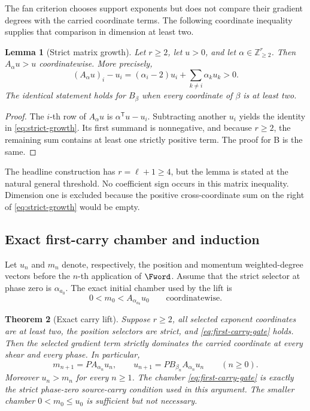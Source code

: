 \documentclass[11pt,letterpaper]{article}
\newtheorem{theorem}{Theorem}[section]
\newtheorem{lemma}[theorem]{Lemma}
\theoremstyle{definition}
\theoremstyle{remark}
\numberwithin{equation}{section}
\begin{document}
The fan criterion chooses support exponents but does not compare their
gradient degrees with the carried coordinate terms.  The following
coordinate inequality supplies that comparison in dimension at least two.

\begin{lemma}[Strict matrix growth]
\label{lem:strict-growth}
Let \(r\geq2\), let \(u>0\), and let
\(\alpha\in\mathbb Z_{\geq2}^{r}\).  Then \(A_\alpha u>u\)
coordinatewise.  More precisely,
\begin{equation}
 (A_\alpha u)_i-u_i
  =(\alpha_i-2)u_i+\sum_{k\ne i}\alpha_k u_k>0.
 \label{eq:strict-growth}
\end{equation}
The identical statement holds for \(B_\beta\) when every coordinate of
\(\beta\) is at least two.
\end{lemma}

\begin{proof}
The \(i\)-th row of \(A_\alpha u\) is
\(\alpha^{\mathsf T}u-u_i\).  Subtracting another \(u_i\) yields the
identity in \eqref{eq:strict-growth}.  Its first summand is nonnegative, and
because \(r\geq2\), the remaining sum contains at least one strictly
positive term.  The proof for B is the same.
\end{proof}

The headline construction has \(r=\ell+1\geq4\), but the lemma is stated at
the natural general threshold.  No coefficient sign occurs in this matrix
inequality.  Dimension one is excluded because the positive cross-coordinate
sum on the right of \eqref{eq:strict-growth} would be empty.

\subsection{Exact first-carry chamber and induction}

Let \(u_n\) and \(m_n\) denote, respectively, the position and momentum
weighted-degree vectors before the \(n\)-th application of \(\Fword\).
Assume that the strict selector at phase zero is \(\alpha_{a_0}\).  The
exact initial chamber used by the lift is
\begin{equation}
 0<m_0<A_{\alpha_{a_0}}u_0
 \qquad\text{coordinatewise}.
 \label{eq:first-carry-gate}
\end{equation}

\begin{theorem}[Exact carry lift]
\label{thm:carry-lift}
Suppose \(r\geq2\), all selected exponent coordinates are at least two, the
position selectors are strict, and \eqref{eq:first-carry-gate} holds.  Then
the selected gradient term strictly dominates the carried coordinate at
every shear and every phase.  In particular,
\begin{equation}
 m_{n+1}=PA_{\alpha_n}u_n,
 \qquad
 u_{n+1}=PB_{\beta_n}A_{\alpha_n}u_n
 \qquad(n\geq0).
 \label{eq:weight-transport}
\end{equation}
Moreover \(u_n>m_n\) for every \(n\geq1\).  The chamber
\eqref{eq:first-carry-gate} is exactly the strict phase-zero source-carry
condition used in this argument.  The smaller chamber \(0<m_0\leq u_0\) is
sufficient but not necessary.
\end{theorem}
\end{document}
